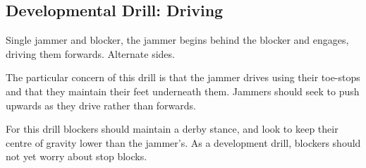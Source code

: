 \subsection*{Developmental Drill: Driving}
\label{drill:one_on_one/developmental/driving}

Single jammer and blocker, the jammer begins behind the blocker and engages, driving them forwards.
Alternate sides.


The particular concern of this drill is that the jammer drives using their toe-stops and that they maintain their feet underneath them.  
Jammers should seek to push upwards as they drive rather than forwards.


For this drill blockers should maintain a derby stance, and look to keep their centre of gravity lower than the jammer's.
As a development drill, blockers should not yet worry about stop blocks.
